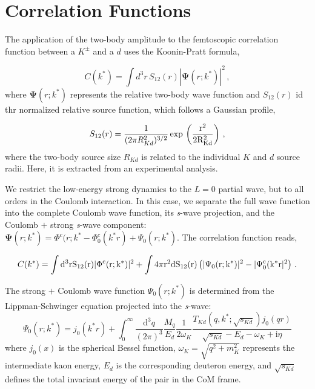 \documentclass[12pt,a4paper]{article}
\begin{document}
\section{Correlation Functions}

The application of the two-body amplitude to the femtoscopic correlation function between a $K^\pm$ and a $d$ uses the Koonin-Pratt formula,

\begin{equation}
C(k^{\ast}) = \int d^3{r} \, S_{12}(r) |\mathbf{\Psi}(r;k^{\ast})|^2 \, ,
\end{equation}
where $\mathbf{\Psi}(r;k^{\ast})$ represents the relative two-body wave function and $S_{12}(r)$ id thr normalized relative source function, which follows a Gaussian profile,

\begin{equation}
S_{12}(r) = \frac{1}{(2 \pi R_{Kd}^2)^{3/2}} \, \rm{exp} \, \left(\frac{r^2}{2R_{Kd}^2} \right) \, ,


\end{equation}
where the two-body source size $R_{Kd}$ is related to the individual $K$ and $d$ source radii. Here, it is extracted from an experimental analysis.

We restrict the low-energy strong dynamics to the $L = 0$ partial wave, but to all orders in the Coulomb interaction. In this case, we separate the full wave function into the complete Coulomb wave function, its \textit{s}-wave projection, and the Coulomb $+$ strong \textit{s}-wave component: $\mathbf{\Psi}(r;k^{\ast}) = \Phi^c(r;k^{\ast} - \Phi_0^c(k^{\ast}r) + \Psi_0(r;k^{\ast})$. The correlation function reads,

\begin{equation}
C(k^{\ast}) = \int \rm{d}^3rS_{12}(r)|\Phi^c(r;k^{\ast})|^2 + \int 4\pi r^2 \rm{d} S_{12}(r) \left(|\Psi_0(r;k^{\ast})|^2 - |\Psi_0^{c}(k^{\ast}r|^2 \right) \, .
\end{equation}

The strong $+$ Coulomb wave function $\Psi_0(r;k^{\ast})$ is determined from the Lippman-Schwinger equation projected into the \textit{s}-wave:
\begin{equation}
\Psi_0(r;k^{\ast}) = j_0(k^{\ast}r) + \int_0^\infty \frac{\mathrm{d}^3q}{(2\pi)^3} \frac{M_q}{E_d} \frac{1}{2\omega_K} \frac{T_{Kd}(q, k^{\ast}; \sqrt{s_{Kd}})j_0(qr)}{\sqrt{s_{Kd}} - E_d - \omega_K + \mathrm{i}\eta}
\end{equation}
where $j_0(x)$ is the spherical Bessel function, $\omega_K  = \sqrt{q^2 + m_K^2}$ represents the intermediate kaon energy, $E_d$ is the corresponding deuteron energy, and $\sqrt{s_{Kd}}$ defines the total invariant energy of the pair in the CoM frame. 
\end{document}
